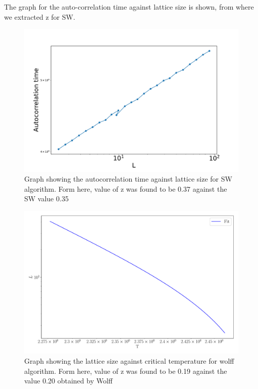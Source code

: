 \documentclass[a4paper,8pt]{article}
\begin{document}
The graph for the auto-correlation time against lattice size is shown, from where we extracted z for SW. 
\begin{figure}[htbp]
    \centering
    \includegraphics[scale = 0.4]{autocorrelation.pdf}
    \caption{Graph showing the autocorrelation time against lattice size for SW algorithm. Form here, value of z was found to be 0.37 against the SW value 0.35\supercite{SW}}
    \label{fig:magnetic sus}
\end{figure}

\begin{figure}[htbp]
    \centering
    \includegraphics[scale = 0.35]{triple_fit_chi.pdf}
    \caption{Graph showing the lattice size against critical temperature for wolff algorithm. Form here, value of z was found to be 0.19 against the value 0.20 obtained by Wolff\supercite{Wolff_algo}}
    \label{fig:magnetic sus}
\end{figure}
\end{document}
